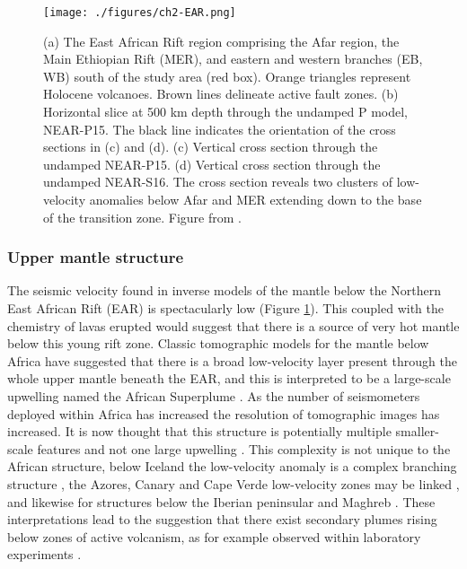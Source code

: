 \begin{figure}
    \centering
    \texttt{[image: ./figures/ch2-EAR.png]}
    \caption{(a) The East African Rift region comprising the Afar region, the Main Ethiopian Rift (MER), and eastern and western branches (EB, WB) south of the study area (red box). Orange triangles represent Holocene volcanoes. Brown lines delineate active fault zones. (b) Horizontal slice at 500 km depth through the undamped P model, NEAR-P15. The black line indicates the orientation of the cross sections in (c) and (d). (c) Vertical cross section through the undamped NEAR-P15. (d) Vertical cross section through the undamped NEAR-S16. The cross section reveals two clusters of low-velocity anomalies below Afar and MER extending down to the base of the transition zone. Figure from \cite{civiero-etal-2019}.}
    \label{fg:EAR}
\end{figure}

\subsubsection*{Upper mantle structure}

The seismic velocity found in inverse models of the mantle below the Northern East African Rift (EAR) is spectacularly low (Figure \ref{fg:EAR}). This coupled with the chemistry of lavas erupted would suggest that there is a source of very hot mantle below this young rift zone. Classic tomographic models for the mantle below Africa have suggested that there is a broad low-velocity layer present through the whole upper mantle beneath the EAR, and this is interpreted to be a large-scale upwelling named the African Superplume \citep[e.g.][]{ritsema-etal-1999}. As the number of seismometers deployed within Africa has increased the resolution of tomographic images has increased. It is now thought that this structure is potentially multiple smaller-scale features and not one large upwelling \citep{chang-2011,hammond-etal-2013,civiero-etal-2015,emry-etal-2019}. This complexity is not unique to the African structure, below Iceland the low-velocity anomaly is a complex branching structure \citep{rickers-etal-2013}, the Azores, Canary and Cape Verde low-velocity zones may be linked \citep{saki-etal-2015}, and likewise for structures below the Iberian peninsular and Maghreb \citep{civiero-etal-2018}. These interpretations lead to the suggestion that there exist secondary plumes rising below zones of active volcanism, as for example observed within laboratory experiments \citep{davaille-2005,kumagai-etal-2007}.

